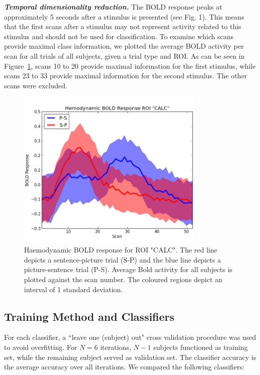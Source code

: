 \documentclass[preprint,journal,11pt]{vgtc}
\begin{document}
\textbf{\emph{Temporal dimensionality reduction.}} The BOLD response peaks at approximately 5 seconds after a stimulus is presented (see Fig. 1). This means that the first scans after a stimulus may not represent activity related to this stimulus and should not be used for classification. To examine which scans provide maximal class information, we plotted the average BOLD activity per scan for all trials of all subjects, given a trial type and ROI. As can be seen in Figure~\ref{fig:boldroi}, scans 10 to 20 provide maximal information for the first stimulus, while scans 23 to 33 provide maximal information for the second stimulus. The other scans were excluded.      
\begin{figure}
	\centering
	\includegraphics[width=90mm]{figures/scan_hemodynamic_BOLD_roi}
  	\caption{Haemodynamic BOLD response for ROI "CALC". The red line depicts a sentence-picture trial (S-P) and the blue line depicts a picture-sentence trial (P-S). Average Bold activity for all subjects is plotted against the scan number. The coloured regions depict an interval of 1 standard deviation.}
  	\label{fig:boldroi}
\end{figure}

\subsection{Training Method and Classifiers}
\label{sec:trainingMethodsAndClassifiers}

For each classifier, a ``leave one (subject) out" cross validation procedure was used to avoid overfitting. For $N=6$ iterations, $N-1$ subjects functioned as training set, while the remaining subject served as validation set. The classifier accuracy is the average accuracy over all iterations. 
We compared the following classifiers:\\
\end{document}
